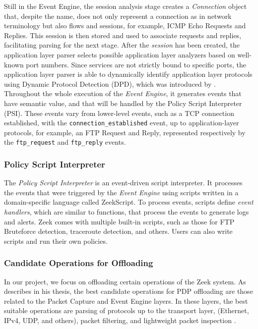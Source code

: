 Still in the Event Engine, the session analysis stage creates a \textit{Connection} object that, despite the name, does not only represent a connection as in network terminology but also flows and sessions, for example, ICMP Echo Requests and Replies. This session is then stored and used to associate requests and replies, facilitating parsing for the next stage. After the \textit{session} has been created, the application layer parser selects possible application layer analyzers based on well-known port numbers. Since services are not strictly bound to specific ports, the application layer parser is able to dynamically identify application layer protocols using Dynamic Protocol Detection (DPD), which was introduced by . Throughout the whole execution of the \textit{Event Engine}, it generates events that have semantic value, and that will be handled by the Policy Script Interpreter (PSI). These events vary from lower-level events, such as a TCP connection established, with the \texttt{connection\_established} event, up to application-layer protocols, for example, an FTP Request and Reply, represented respectively by the \texttt{ftp\_request} and  \texttt{ftp\_reply} events.


\subsubsection*{Policy Script Interpreter}
\label{sec:bg:zeek_psi}

The \textit{Policy Script Interpreter} is an event-driven script interpreter. It processes the events that were triggered by the \textit{Event Engine} using scripts written in a domain-specific language called ZeekScript. To process events, scripts define \textit{event handlers}, which are similar to functions, that process the events to generate logs and alerts. Zeek comes with multiple built-in scripts, such as those for FTP Bruteforce detection, traceroute detection, and others. Users can also write scripts and run their own policies.


\subsubsection*{Candidate Operations for Offloading}
\label{sec:bg:zeek_candidate_operations}

In our project, we focus on offloading certain operations of the Zeek system. As  describes in his thesis, the best candidate operations for PDP offloading are those related to the Packet Capture and Event Engine layers. In these layers, the best suitable operations are parsing of protocols up to the transport layer, (Ethernet, IPv4, UDP, and others), packet filtering, and lightweight packet inspection \cite{Ilha2022}.

